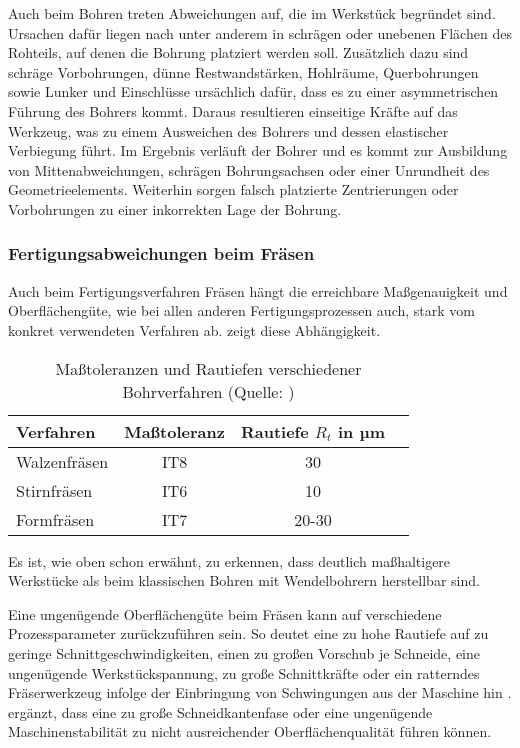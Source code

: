 Auch beim Bohren treten Abweichungen auf, die im Werkstück begründet sind. Ursachen dafür liegen nach \cite{Paucksch.2008} unter anderem in schrägen oder unebenen Flächen des Rohteils, auf denen die Bohrung platziert werden soll. Zusätzlich dazu sind schräge Vorbohrungen, dünne Restwandstärken, Hohlräume, Querbohrungen sowie Lunker und Einschlüsse ursächlich dafür, dass es zu einer asymmetrischen Führung des Bohrers kommt. Daraus resultieren einseitige Kräfte auf das Werkzeug, was zu einem Ausweichen des Bohrers und dessen elastischer Verbiegung führt. Im Ergebnis verläuft der Bohrer und es kommt zur Ausbildung von Mittenabweichungen, schrägen Bohrungsachsen oder einer Unrundheit des Geometrieelements.
Weiterhin sorgen falsch platzierte Zentrierungen oder Vorbohrungen zu einer inkorrekten Lage der Bohrung.   

\subsubsection {Fertigungsabweichungen beim Fräsen}

Auch beim Fertigungsverfahren Fräsen hängt die erreichbare Maßgenauigkeit und Oberflächengüte, wie bei allen anderen Fertigungsprozessen auch, stark vom konkret verwendeten Verfahren ab.  zeigt diese Abhängigkeit. 

 
 \begin{table}[h]	
 	
 	\begin{tabularx}{\columnwidth}{|X|c|c|l|}	
 		
 		
 		\hline
 		\textbf{Verfahren}&\textbf{Maßtoleranz}&\textbf{Rautiefe $R_{t}$ in µm}\\
 		\hline
 		Walzenfräsen&IT8&30\\
 		\hline
 		Stirnfräsen&IT6&10\\
 		\hline
 		Formfräsen&IT7&20-30\\
 		\hline
 		
 	\end{tabularx}
 	
 	\caption{Maßtoleranzen und Rautiefen verschiedener Bohrverfahren (Quelle: \cite{Dietrich.2014})}
 	\label{tab:fraesqualität}
 	
 \end{table}

Es ist, wie oben schon erwähnt, zu erkennen, dass deutlich maßhaltigere Werkstücke als beim klassischen Bohren mit Wendelbohrern herstellbar sind. 

Eine ungenügende Oberflächengüte beim Fräsen kann auf verschiedene Prozessparameter zurückzuführen sein. So deutet eine zu hohe Rautiefe auf zu geringe Schnittgeschwindigkeiten, einen zu großen Vorschub je Schneide, eine ungenügende Werkstückspannung, zu große Schnittkräfte oder ein ratterndes Fräserwerkzeug infolge der Einbringung von Schwingungen aus der Maschine hin \cite{Dietrich.2014}.
\cite{Winkler.1990} ergänzt, dass eine zu große Schneidkantenfase oder eine ungenügende Maschinenstabilität zu nicht ausreichender Oberflächenqualität führen können. 

